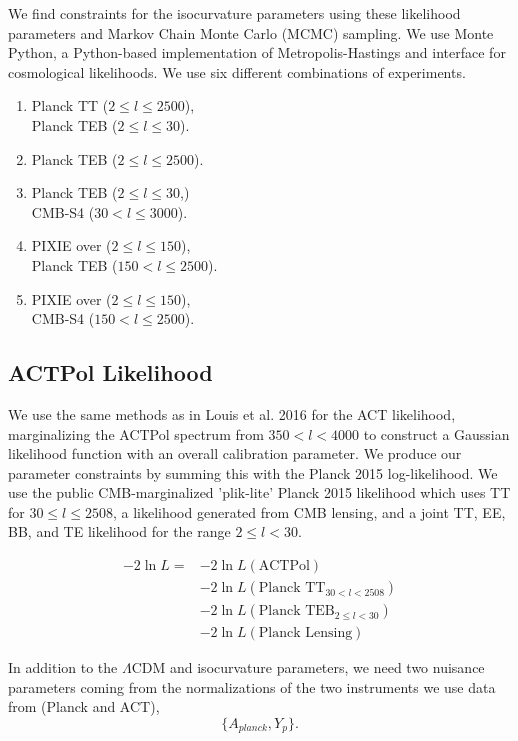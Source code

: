 \documentclass{emulateapj}
\begin{document}
We find constraints for the isocurvature parameters using these likelihood parameters and Markov Chain Monte Carlo (MCMC) sampling. We use Monte Python, a Python-based implementation of Metropolis-Hastings and interface for cosmological likelihoods. We use six different combinations of experiments.
\begin{enumerate}
\item Planck TT ($2 \leq l \leq 2500$), \\ Planck TEB ($2 \leq l \leq 30$).
\item Planck TEB ($2 \leq l \leq 2500$).
\item Planck TEB ($2 \leq l \leq 30$,) \\CMB-S4 ($30 < l \leq 3000$).
\item PIXIE over ($2 \leq l \leq 150$),\\ Planck TEB ($150 < l  \leq 2500$).
\item PIXIE over ($2 \leq l \leq 150$),\\ CMB-S4 ($150 < l  \leq 2500$).
\end{enumerate}

\subsection{ACTPol Likelihood}

We use the same methods as in Louis et al. 2016 for the ACT likelihood, marginalizing the ACTPol spectrum from $350 < l < 4000$ to construct a Gaussian likelihood function with an overall calibration parameter. We produce our parameter constraints by summing this with the Planck 2015 log-likelihood. We use the public CMB-marginalized 'plik-lite' Planck 2015 likelihood which uses TT for $30 \leq l \leq 2508$, a likelihood generated from CMB lensing, and a joint TT, EE, BB, and TE likelihood for the range $2 \leq l < 30$.

\begin{align}
-2 \ln L = &- 2 \ln L(\text{ACTPol}) \\
&-2 \ln L(\text{Planck TT}_{30 < l < 2508}) \\
&-2 \ln L(\text{Planck TEB}_{2 \leq l < 30})\\
&-2 \ln L(\text{Planck Lensing})
\end{align}

In addition to the $\Lambda$CDM and isocurvature parameters, we need two nuisance parameters coming from the normalizations of the two instruments we use data from (Planck and ACT),
\begin{equation}
\{ A_{planck}, Y_p \}.
\end{equation}
\end{document}
